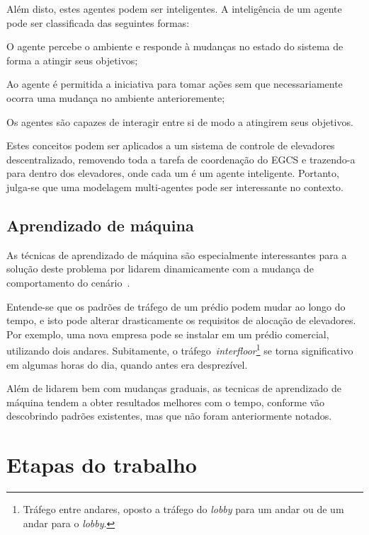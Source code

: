 Além disto, estes agentes podem ser inteligentes. A inteligência de um agente pode ser classificada das seguintes formas:

\begin{description}[leftmargin=!,labelwidth=\widthof{\bfseries Pró-ativa}]
  \item[Reativa]    O agente percebe o ambiente e responde à mudanças no estado
                    do sistema de forma a atingir seus objetivos;
  \item[Pró-ativa]  Ao agente é permitida a iniciativa para tomar ações sem que
                    necessariamente ocorra uma mudança no ambiente
                    anterioremente;
  \item[Social]     Os agentes são capazes de interagir entre si de modo a
                    atingirem seus objetivos.
\end{description}

Estes conceitos podem ser aplicados a um sistema de controle de elevadores
descentralizado, removendo toda a tarefa de coordenação do EGCS e trazendo-a
para dentro dos elevadores, onde cada um é um agente inteligente. Portanto,
julga-se que uma modelagem multi-agentes pode ser interessante no contexto.

\subsection{\label{section:machinelearning}Aprendizado de máquina}

As técnicas de aprendizado de máquina são especialmente interessantes para a
solução deste problema por lidarem dinamicamente com a mudança de comportamento
do cenário~\cite{Russell:2003:AIM:773294}.

Entende-se que os padrões de tráfego de um prédio podem mudar ao longo do tempo,
e isto pode alterar drasticamente os requisitos de alocação de elevadores. Por
exemplo, uma nova empresa pode se instalar em um prédio comercial, utilizando
dois andares. Subitamente, o tráfego~\textit{interfloor}\footnote{Tráfego entre
andares, oposto a tráfego do \textit{lobby} para um andar ou de um andar para
o \textit{lobby}.} se torna significativo em algumas horas do dia, quando antes
era desprezível.

Além de lidarem bem com mudanças graduais, as tecnicas de aprendizado de máquina
tendem a obter resultados melhores com o tempo, conforme vão descobrindo padrões
existentes, mas que não foram anteriormente notados.

\section{\label{chap:stages}Etapas do trabalho}

